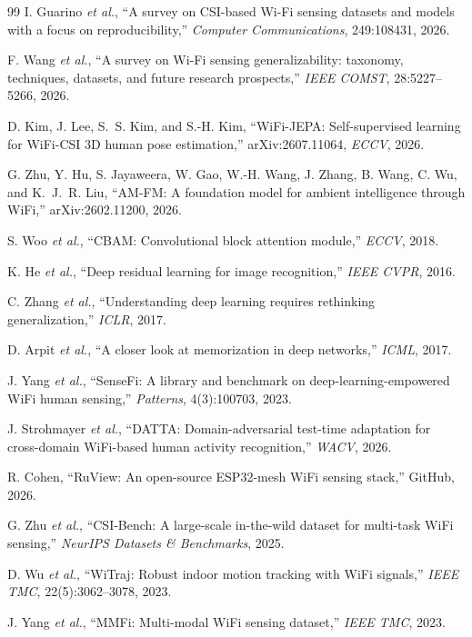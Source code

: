 \documentclass[11pt]{article}
\theoremstyle{definition}
\newcommand{\etal}{\textit{et al.}}
\begin{document}
\begin{thebibliography}{99}
 I. Guarino \etal, ``A survey on CSI-based Wi-Fi sensing datasets and models with a focus on reproducibility,'' \emph{Computer Communications}, 249:108431, 2026.

 F. Wang \etal, ``A survey on Wi-Fi sensing generalizability: taxonomy, techniques, datasets, and future research prospects,'' \emph{IEEE COMST}, 28:5227--5266, 2026.

 D. Kim, J. Lee, S.~S. Kim, and S.-H. Kim, ``WiFi-JEPA: Self-supervised learning for WiFi-CSI 3D human pose estimation,'' arXiv:2607.11064, \emph{ECCV}, 2026.

 G. Zhu, Y. Hu, S. Jayaweera, W. Gao, W.-H. Wang, J. Zhang, B. Wang, C. Wu, and K.~J.~R. Liu, ``AM-FM: A foundation model for ambient intelligence through WiFi,'' arXiv:2602.11200, 2026.

 S. Woo \etal, ``CBAM: Convolutional block attention module,'' \emph{ECCV}, 2018.

 K. He \etal, ``Deep residual learning for image recognition,'' \emph{IEEE CVPR}, 2016.

 C. Zhang \etal, ``Understanding deep learning requires rethinking generalization,'' \emph{ICLR}, 2017.

 D. Arpit \etal, ``A closer look at memorization in deep networks,'' \emph{ICML}, 2017.

 J. Yang \etal, ``SenseFi: A library and benchmark on deep-learning-empowered WiFi human sensing,'' \emph{Patterns}, 4(3):100703, 2023.

 J. Strohmayer \etal, ``DATTA: Domain-adversarial test-time adaptation for cross-domain WiFi-based human activity recognition,'' \emph{WACV}, 2026.

 R. Cohen, ``RuView: An open-source ESP32-mesh WiFi sensing stack,'' GitHub, 2026.

 G. Zhu \etal, ``CSI-Bench: A large-scale in-the-wild dataset for multi-task WiFi sensing,'' \emph{NeurIPS Datasets \& Benchmarks}, 2025.

 D. Wu \etal, ``WiTraj: Robust indoor motion tracking with WiFi signals,'' \emph{IEEE TMC}, 22(5):3062--3078, 2023.

 J. Yang \etal, ``MMFi: Multi-modal WiFi sensing dataset,'' \emph{IEEE TMC}, 2023.


\end{thebibliography}
\end{document}

